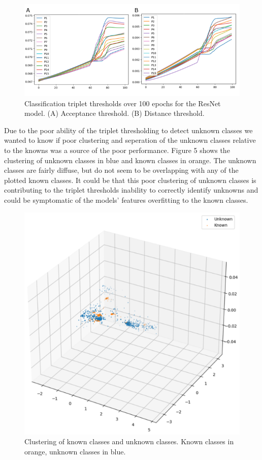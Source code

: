 \documentclass[conference]{IEEEtran}
\begin{document}
\begin{figure}
\centerline{\includegraphics[scale=0.5]{Images/Thresholds_Over_Epochs.png}}
\caption{Classification triplet thresholds over 100 epochs for the ResNet model. (A) Acceptance threshold. (B) Distance threshold.}
\label{fig}
\end{figure}

Due to the poor ability of the triplet thresholding to detect unknown classes we wanted to know if poor clustering and seperation of the unknown classes relative to the knowns was a source of the poor performance. Figure 5 shows the clustering of unknown classes in blue and known classes in orange. The unknown classes are fairly diffuse, but do not seem to be overlapping with any of the plotted known classes. It could be that this poor clustering of unknown classes is contributing to the triplet thresholds inability to correctly identify unknowns and could be symptomatic of the models' features overfitting to the known classes.

 \begin{figure}
\centerline{\includegraphics[scale=0.4]{Images/Known_vs_Unknown_Clustering.png}}
\caption{Clustering of known classes and unknown classes. Known classes in orange, unknown classes in blue.}
\label{fig}
\end{figure}
\end{document}
